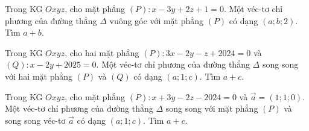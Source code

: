 \begin{ex}%
	Trong KG $Oxyz$, cho mặt phẳng $(P) \colon x-3y+2z+1=0$.  Một véc-tơ chỉ phương của đường thẳng $\Delta $ vuông góc với mặt phẳng $\left( P \right)$ có dạng $(a;b;2)$. Tìm $a+b$.
\end{ex}


\begin{ex}%
	Trong KG $Oxyz$, cho hai mặt phẳng $( P) \colon 3x-2y-z+2024=0$ và $(Q) \colon x-2y+2025=0$. Một véc-tơ chỉ phương của đường thẳng $\Delta $ song song với hai mặt phẳng $\left( P \right)$ và $\left( Q \right)$ có dạng $(a;1;c)$. Tìm $a+c$.
\end{ex}
\begin{ex}%
	Trong KG $Oxyz$, cho mặt phẳng $(P) \colon x+3y-2z-2024=0$ và $\overrightarrow{a}=\left( 1;1;0 \right)$. Một véc-tơ chỉ phương của đường thẳng $\Delta $ song song với mặt phẳng $(P)$ và song song véc-tơ $\overrightarrow{a}$ có dạng $(a;1;c)$. Tìm $a+c$.
\end{ex}
